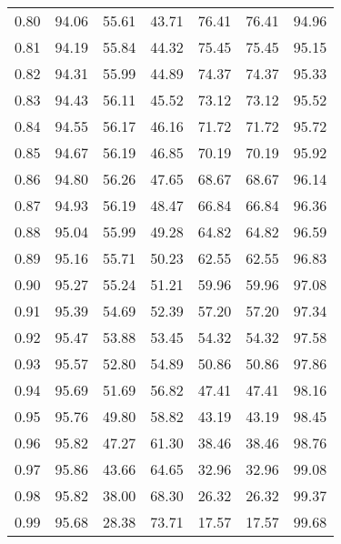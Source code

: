 \begin{tabular}{|c|c|c|c|c|c|c|}
      0.80 &     94.06 &     55.61 &      43.71 &   76.41 &      76.41 &         94.96 \\
      0.81 &     94.19 &     55.84 &      44.32 &   75.45 &      75.45 &         95.15 \\
      0.82 &     94.31 &     55.99 &      44.89 &   74.37 &      74.37 &         95.33 \\
      0.83 &     94.43 &     56.11 &      45.52 &   73.12 &      73.12 &         95.52 \\
      0.84 &     94.55 &     56.17 &      46.16 &   71.72 &      71.72 &         95.72 \\
      0.85 &     94.67 &     56.19 &      46.85 &   70.19 &      70.19 &         95.92 \\
      0.86 &     94.80 &     56.26 &      47.65 &   68.67 &      68.67 &         96.14 \\
      0.87 &     94.93 &     56.19 &      48.47 &   66.84 &      66.84 &         96.36 \\
      0.88 &     95.04 &     55.99 &      49.28 &   64.82 &      64.82 &         96.59 \\
      0.89 &     95.16 &     55.71 &      50.23 &   62.55 &      62.55 &         96.83 \\
      0.90 &     95.27 &     55.24 &      51.21 &   59.96 &      59.96 &         97.08 \\
      0.91 &     95.39 &     54.69 &      52.39 &   57.20 &      57.20 &         97.34 \\
      0.92 &     95.47 &     53.88 &      53.45 &   54.32 &      54.32 &         97.58 \\
      0.93 &     95.57 &     52.80 &      54.89 &   50.86 &      50.86 &         97.86 \\
      0.94 &     95.69 &     51.69 &      56.82 &   47.41 &      47.41 &         98.16 \\
      0.95 &     95.76 &     49.80 &      58.82 &   43.19 &      43.19 &         98.45 \\
      0.96 &     95.82 &     47.27 &      61.30 &   38.46 &      38.46 &         98.76 \\
      0.97 &     95.86 &     43.66 &      64.65 &   32.96 &      32.96 &         99.08 \\
      0.98 &     95.82 &     38.00 &      68.30 &   26.32 &      26.32 &         99.37 \\
      0.99 &     95.68 &     28.38 &      73.71 &   17.57 &      17.57 &         99.68 \\
\bottomrule
\end{tabular}
